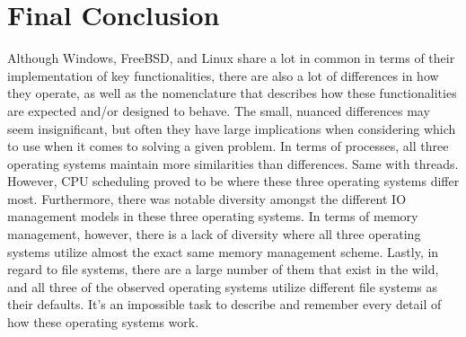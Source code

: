 \documentclass[onecolumn, draftclsnofoot,10pt, compsoc]{IEEEtran}
\begin{document}
\newpage
\section{Final Conclusion}
\noindent Although Windows, FreeBSD, and Linux share a lot in common in terms of their implementation of key functionalities, there are also a lot of differences in how they operate, as well as the nomenclature that describes how these functionalities are expected and/or designed to behave. The small, nuanced differences may seem insignificant, but often they have large implications when considering which to use when it comes to solving a given problem. In terms of processes, all three operating systems maintain more similarities than differences. Same with threads. However, CPU scheduling proved to be where these three operating systems differ most. Furthermore, there was notable diversity amongst the different IO management models in these three operating systems. In terms of memory management, however, there is a lack of diversity where all three operating systems utilize almost the exact same memory management scheme. Lastly, in regard to file systems, there are a large number of them that exist in the wild, and all three of the observed operating systems utilize different file systems as their defaults. It's an impossible task to describe and remember every detail of how these operating systems work.  

\newpage
\nocite{*}


\end{document}
